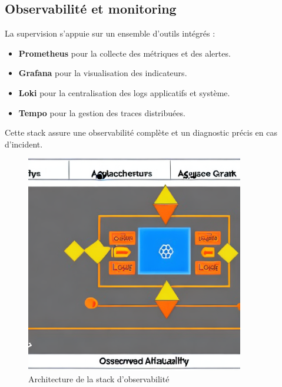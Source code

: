 \subsection{Observabilité et monitoring}

La supervision s'appuie sur un ensemble d’outils intégrés :

\begin{itemize}
	\item \textbf{Prometheus} pour la collecte des métriques et des alertes.
	\item \textbf{Grafana} pour la visualisation des indicateurs.
	\item \textbf{Loki} pour la centralisation des logs applicatifs et système.
	\item \textbf{Tempo} pour la gestion des traces distribuées.
\end{itemize}

Cette stack assure une observabilité complète et un diagnostic précis en cas d’incident.

\begin{figure}[H]
	\centering
	\includegraphics[width=0.85\textwidth]{figures/observabilite-stack.png}
	\caption{Architecture de la stack d'observabilité}
\end{figure}

